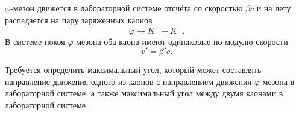 \documentclass[../final.tex]{subfiles}
\begin{document}

\newpage
{}

\condition

$\varphi$-мезон движется в лабораторной системе отсчёта
со скоростью $\beta c$ и на лету распадается на пару заряженных
каонов
%
\begin{equation*}
    \varphi \rightarrow K^+ + K^-.
\end{equation*}
%
В системе покоя $\varphi$-мезона оба каона имеют одинаковые
по модулю скорости
%
\begin{equation*}
    v'=\beta'c.
\end{equation*}

Требуется определить максимальный угол, который может составлять
направление движения одного из каонов с направлением движения
$\varphi$-мезона в лабораторной системе, а также максимальный угол
между двумя каонами в лабораторной системе.


\end{document}

